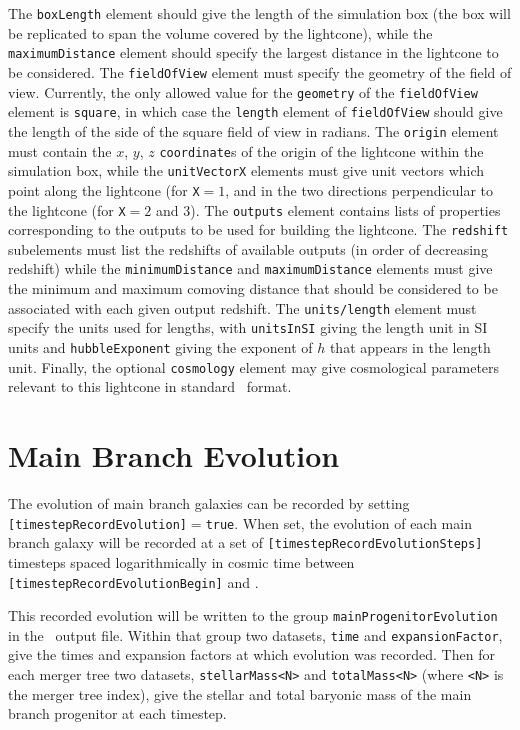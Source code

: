 The {\tt boxLength} element should give the length of the simulation box (the box will be replicated to span the volume covered by the lightcone), while the {\tt maximumDistance} element should specify the largest distance in the lightcone to be considered. The {\tt fieldOfView} element must specify the geometry of the field of view. Currently, the only allowed value for the {\tt geometry} of the {\tt fieldOfView} element is {\tt square}, in which case the {\tt length} element of {\tt fieldOfView} should give the length of the side of the square field of view in radians. The {\tt origin} element must contain the $x$, $y$, $z$ {\tt coordinate}s of the origin of the lightcone within the simulation box, while the {\tt unitVectorX} elements must give unit vectors which point along the lightcone (for {\tt X}$=1$, and in the two directions perpendicular to the lightcone (for {\tt X}$=2$ and 3). The {\tt outputs} element contains lists of properties corresponding to the outputs to be used for building the lightcone. The {\tt redshift} subelements must list the redshifts of available outputs (in order of decreasing redshift) while the {\tt minimumDistance} and {\tt maximumDistance} elements must give the minimum and maximum comoving distance that should be considered to be associated with each given output redshift. The {\tt units/length} element must specify the units used for lengths, with {\tt unitsInSI} giving the length unit in SI units and {\tt hubbleExponent} giving the exponent of $h$ that appears in the length unit. Finally, the optional {\tt cosmology} element may give cosmological parameters relevant to this lightcone in standard \glc\ format.

\section{Main Branch Evolution}

The evolution of main branch galaxies can be recorded by setting {\tt [timestepRecordEvolution]}$=${\tt true}. When set, the evolution of each main branch galaxy will be recorded at a set of {\tt [timestepRecordEvolutionSteps]} timesteps spaced logarithmically in cosmic time between {\tt [timestepRecordEvolutionBegin]} and \newline {\tt [timestepRecordEvolutionEnd]}. 

This recorded evolution will be written to the group {\tt mainProgenitorEvolution} in the \glc\ output file. Within that group two datasets, {\tt time} and {\tt expansionFactor}, give the times and expansion factors at which evolution was recorded. Then for each merger tree two datasets, {\tt stellarMass<N>} and {\tt totalMass<N>} (where {\tt <N>} is the merger tree index), give the stellar and total baryonic mass of the main branch progenitor at each timestep.

